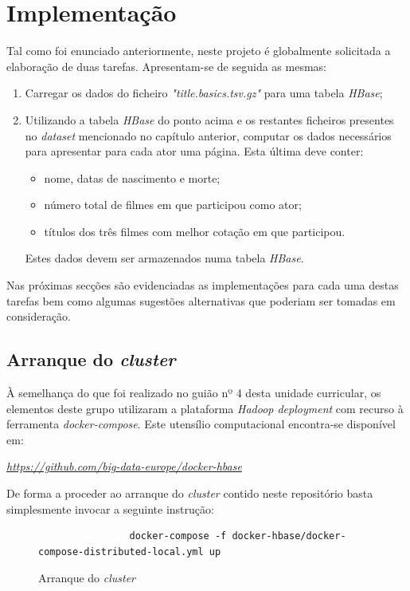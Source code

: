 \documentclass[a4paper]{report}
\begin{document}
	\chapter{Implementação} \label{ch:Implementation}
	\large {
		Tal como foi enunciado anteriormente, neste projeto é globalmente solicitada a elaboração de duas tarefas. Apresentam-se de seguida as mesmas:
		\begin{enumerate}
			\item Carregar os dados do ficheiro \textit{"title.basics.tsv.gz"} para uma tabela \textit{HBase};
			\item Utilizando a tabela \textit{HBase} do ponto acima e os restantes ficheiros presentes no \textit{dataset} mencionado no capítulo anterior, computar os dados necessários para apresentar para cada ator uma página. Esta última deve conter:
			\begin{itemize}
				\item nome, datas de nascimento e morte;
				\item número total de filmes em que participou como ator;
				\item títulos dos três filmes com melhor cotação em que participou.
			\end{itemize}
			Estes dados devem ser armazenados numa tabela \textit{HBase}.
		\end{enumerate}
		
		Nas próximas secções são evidenciadas as implementações para cada uma destas tarefas bem como algumas sugestões alternativas que poderiam ser tomadas em consideração.
		
		\section{Arranque do \textit{cluster}} \label{sec:Cluster}
		À semelhança do que foi realizado no guião nº 4 desta unidade curricular, os elementos deste grupo utilizaram a plataforma \textit{Hadoop deployment} com recurso à ferramenta \textit{docker-compose}. Este utensílio computacional encontra-se disponível em:
		\begin{center}
			\textit{\url{https://github.com/big-data-europe/docker-hbase}}
		\end{center}
		
		De forma a proceder ao arranque do \textit{cluster} contido neste repositório basta simplesmente invocar a seguinte instrução:
		\begin{figure}[H]
			{
				\color{teal}
				\begin{verbatim}
				docker-compose -f docker-hbase/docker-compose-distributed-local.yml up
				\end{verbatim}
			}
			\caption{Arranque do \textit{cluster}}
			\label{fig:1}
		\end{figure}
		
}
\end{document}
